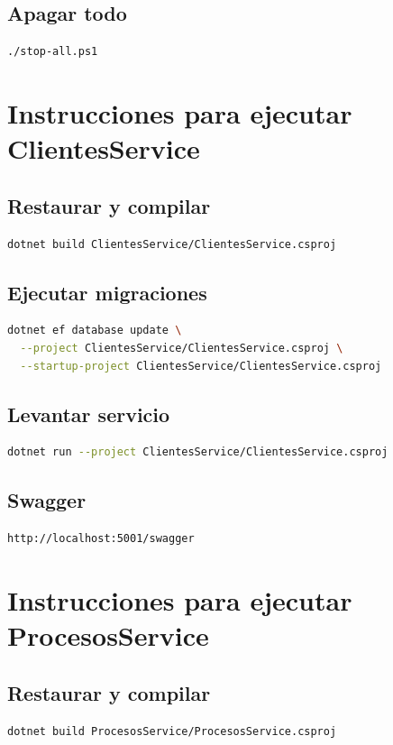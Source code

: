 \documentclass[12pt]{article}
\begin{document}
\subsection*{Apagar todo}
\begin{verbatim}
./stop-all.ps1
\end{verbatim}

\section{Instrucciones para ejecutar ClientesService}

\subsection*{Restaurar y compilar}
\begin{lstlisting}[language=bash]
dotnet build ClientesService/ClientesService.csproj
\end{lstlisting}

\subsection*{Ejecutar migraciones}
\begin{lstlisting}[language=bash]
dotnet ef database update \
  --project ClientesService/ClientesService.csproj \
  --startup-project ClientesService/ClientesService.csproj
\end{lstlisting}

\subsection*{Levantar servicio}
\begin{lstlisting}[language=bash]
dotnet run --project ClientesService/ClientesService.csproj
\end{lstlisting}

\subsection*{Swagger}
\begin{lstlisting}[language=bash]
http://localhost:5001/swagger
\end{lstlisting}

\section{Instrucciones para ejecutar ProcesosService}

\subsection*{Restaurar y compilar}
\begin{lstlisting}[language=bash]
dotnet build ProcesosService/ProcesosService.csproj
\end{lstlisting}
\end{document}
